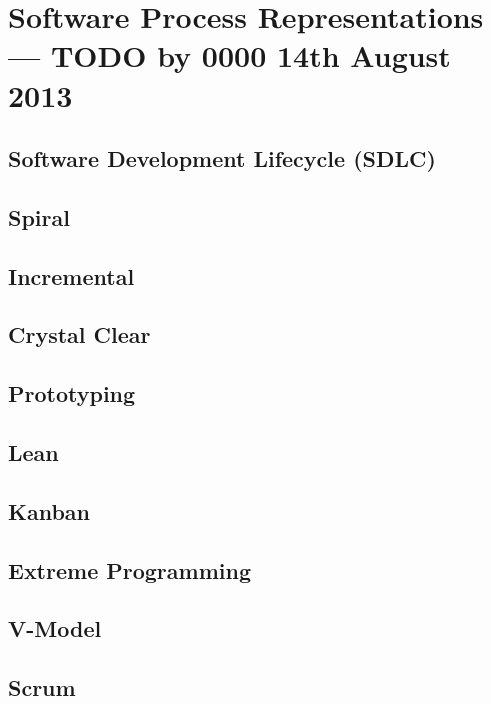 \section{Software Process Representations--- TODO by 0000 14th August 2013} \label{diagrams}

\subsection{Software Development Lifecycle (SDLC)}

\subsection{Spiral}

\subsection{Incremental}

\subsection{Crystal Clear}

\subsection{Prototyping}

\subsection{Lean}

\subsection{Kanban}

\subsection{Extreme Programming}

\subsection{V-Model}

\subsection{Scrum}
